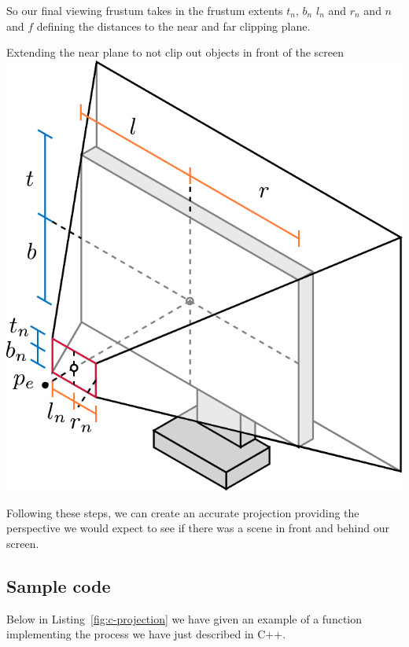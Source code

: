 So our final viewing frustum takes in the frustum extents $t_n$, $b_n$ $l_n$ and $r_n$ and $n$ and $f$ defining the distances to the near and far clipping plane.
\begin{figureBox}[label={fig:extending-near}, width=0.8\linewidth]{Extending the near plane to not clip out objects in front of the screen}
    \centering
    \includegraphics[width = 0.5\linewidth]{./background/figures/projection/extending-near.pdf}
\end{figureBox}

Following these steps, we can create an accurate projection providing the perspective we would expect to see if there was a scene in front and behind our screen. 

\subsection{Sample code}
Below in Listing~\ref{fig:c-projection} we have given an example of a function implementing the process we have just described in C++.

